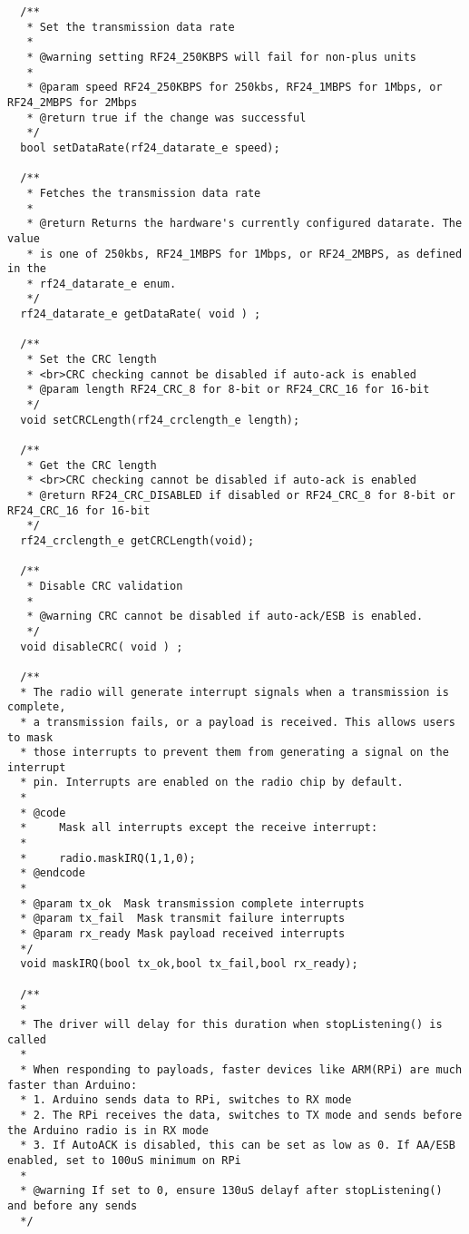 \documentclass{article}
\begin{document}
\begin{itemize}
\begin{enumerate}
\begin{enumerate}
\begin{lstlisting}
  /**
   * Set the transmission data rate
   *
   * @warning setting RF24_250KBPS will fail for non-plus units
   *
   * @param speed RF24_250KBPS for 250kbs, RF24_1MBPS for 1Mbps, or RF24_2MBPS for 2Mbps
   * @return true if the change was successful
   */
  bool setDataRate(rf24_datarate_e speed);

  /**
   * Fetches the transmission data rate
   *
   * @return Returns the hardware's currently configured datarate. The value
   * is one of 250kbs, RF24_1MBPS for 1Mbps, or RF24_2MBPS, as defined in the
   * rf24_datarate_e enum.
   */
  rf24_datarate_e getDataRate( void ) ;

  /**
   * Set the CRC length
   * <br>CRC checking cannot be disabled if auto-ack is enabled
   * @param length RF24_CRC_8 for 8-bit or RF24_CRC_16 for 16-bit
   */
  void setCRCLength(rf24_crclength_e length);

  /**
   * Get the CRC length
   * <br>CRC checking cannot be disabled if auto-ack is enabled
   * @return RF24_CRC_DISABLED if disabled or RF24_CRC_8 for 8-bit or RF24_CRC_16 for 16-bit
   */
  rf24_crclength_e getCRCLength(void);

  /**
   * Disable CRC validation
   * 
   * @warning CRC cannot be disabled if auto-ack/ESB is enabled.
   */
  void disableCRC( void ) ;

  /**
  * The radio will generate interrupt signals when a transmission is complete,
  * a transmission fails, or a payload is received. This allows users to mask
  * those interrupts to prevent them from generating a signal on the interrupt
  * pin. Interrupts are enabled on the radio chip by default.
  *
  * @code
  * 	Mask all interrupts except the receive interrupt:
  *
  *		radio.maskIRQ(1,1,0);
  * @endcode
  *
  * @param tx_ok  Mask transmission complete interrupts
  * @param tx_fail  Mask transmit failure interrupts
  * @param rx_ready Mask payload received interrupts
  */
  void maskIRQ(bool tx_ok,bool tx_fail,bool rx_ready);
  
  /**
  * 
  * The driver will delay for this duration when stopListening() is called
  * 
  * When responding to payloads, faster devices like ARM(RPi) are much faster than Arduino:
  * 1. Arduino sends data to RPi, switches to RX mode
  * 2. The RPi receives the data, switches to TX mode and sends before the Arduino radio is in RX mode
  * 3. If AutoACK is disabled, this can be set as low as 0. If AA/ESB enabled, set to 100uS minimum on RPi
  *
  * @warning If set to 0, ensure 130uS delayf after stopListening() and before any sends
  */
  

\end{lstlisting}
\end{enumerate}
\end{enumerate}
\end{itemize}
\end{document}
